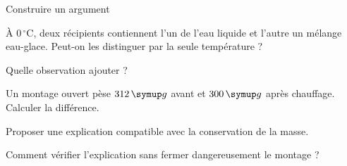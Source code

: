\par\noindent\begin{minipage}{\linewidth}
\begin{exercice}[3]{Construire un argument}
\begin{questions}
\item À $0\,^{\circ}\mathrm C$, deux récipients contiennent l’un de l’eau liquide et l’autre un mélange eau-glace. Peut-on les distinguer par la seule température ?
\item Quelle observation ajouter ?
\end{questions}
\end{exercice}
\end{minipage}
\label{defi-ex-3}
\begin{questions}
\item Un montage ouvert pèse $312\unite g$ avant et $300\unite g$ après chauffage. Calculer la différence.
\item Proposer une explication compatible avec la conservation de la masse.
\item Comment vérifier l’explication sans fermer dangereusement le montage ?
\end{questions}
\pcGrille
